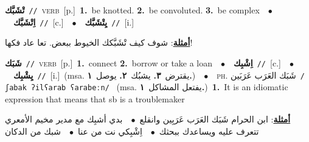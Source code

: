 \documentclass[10pt,a4paper,twoside]{article} %
\begin{document}
\begin{multicols}{2}
{\setlength\topsep{0pt}\textbf{\foreignlanguage{arabic}{تْشَبَّك}}\ {\color{gray}\texttt{//}\color{black}}\ \textsc{verb}\ [p.]\ \textbf{1.}~be knotted.  \textbf{2.}~be convoluted.  \textbf{3.}~be complex\ \ $\bullet$\ \ \setlength\topsep{0pt}\textbf{\foreignlanguage{arabic}{اِتْشَبَّك}}\ {\color{gray}\texttt{//}\color{black}}\ [c.]\ \ $\bullet$\ \ \setlength\topsep{0pt}\textbf{\foreignlanguage{arabic}{يِتْشَبَّك}}\ {\color{gray}\texttt{//}\color{black}}\ [i.]\  \begin{flushright}\color{gray}\foreignlanguage{arabic}{\textbf{\underline{\foreignlanguage{arabic}{أمثلة}}}: شوف كيف تْشَبَّكك الخيوط ببعض. تعا عاد فكها!}\end{flushright}\color{black}} \vspace{2mm}

{\setlength\topsep{0pt}\textbf{\foreignlanguage{arabic}{شَبَك}}\ {\color{gray}\texttt{//}\color{black}}\ \textsc{verb}\ [p.]\ \textbf{1.}~connect  \textbf{2.}~borrow or take a loan\ \ $\bullet$\ \ \setlength\topsep{0pt}\textbf{\foreignlanguage{arabic}{اِشْبِك}}\ {\color{gray}\texttt{//}\color{black}}\ [c.]\ \ $\bullet$\ \ \setlength\topsep{0pt}\textbf{\foreignlanguage{arabic}{يِشْبِك}}\ {\color{gray}\texttt{//}\color{black}}\ [i.]\ \color{gray}(msa. \foreignlanguage{arabic}{يقترض}~\foreignlanguage{arabic}{\textbf{٣.}}  \foreignlanguage{arabic}{يشبُك}~\foreignlanguage{arabic}{\textbf{٢.}}  \foreignlanguage{arabic}{يوصل}~\foreignlanguage{arabic}{\textbf{١.}})\color{black}\ \ $\bullet$\ \ \textsc{ph.} \color{gray} \foreignlanguage{arabic}{شَبَك العَرَب عَرَبَين}\color{black}\ {\color{gray}\texttt{/{\sffamily ʃabak ʔilʕarab ʕarabeːn}/}\color{black}}\ \color{gray} (msa. \foreignlanguage{arabic}{يفتعل المشاكل}~\foreignlanguage{arabic}{\textbf{١.}})\color{black}\ \textbf{1.}~It is an idiomatic expression that means that sb is a troublemaker\  \begin{flushright}\color{gray}\foreignlanguage{arabic}{\textbf{\underline{\foreignlanguage{arabic}{أمثلة}}}: ابن الحرام شَبَك العَرَب عَرَبِين وانقلع\ $\bullet$\ \  بدي أشبِك مع مدير مخيم الأمعري تتعرف عليه ويساعدك ببحثك\ $\bullet$\ \  اِشْبِكي نت من عنا\ $\bullet$\ \  شبك من الدكان}\end{flushright}\color{black}} \vspace{2mm}


\end{multicols}
\end{document}
